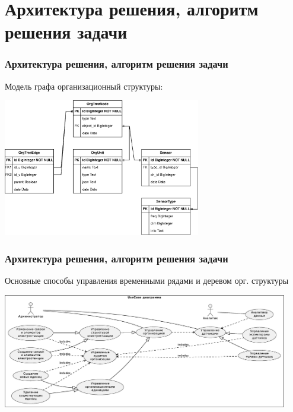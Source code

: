 \documentclass[pdf, hyperref={unicode}, aspectratio=169]{beamer}
\begin{document}
\section{Архитектура решения, алгоритм решения задачи}
\begin{frame}
	\frametitle{Архитектура решения, алгоритм решения задачи}
	
	Модель графа организационный структуры:
	
	\begin{center}
		\includegraphics[height = 6cm]{pg.drawio.eps}
	\end{center}
\end{frame}


\begin{frame}
	\frametitle{Архитектура решения, алгоритм решения задачи}
	
	Основные способы управления временными рядами и деревом орг. структуры
	
	\begin{center}
		\includegraphics[height = 5cm]{usecases_hard.eps}
	\end{center}
\end{frame}
\end{document}
